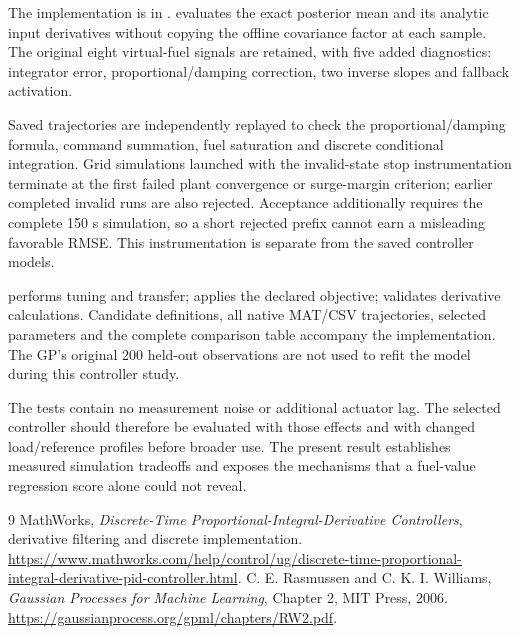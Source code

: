 The implementation is in .  evaluates the exact posterior mean and its analytic input derivatives without copying the offline covariance factor at each sample. The original eight virtual-fuel signals are retained, with five added diagnostics: integrator error, proportional/damping correction, two inverse slopes and fallback activation.

Saved trajectories are independently replayed to check the proportional/damping formula, command summation, fuel saturation and discrete conditional integration. Grid simulations launched with the invalid-state stop instrumentation terminate at the first failed plant convergence or surge-margin criterion; earlier completed invalid runs are also rejected. Acceptance additionally requires the complete 150 s simulation, so a short rejected prefix cannot earn a misleading favorable RMSE. This instrumentation is separate from the saved controller models.

 performs tuning and transfer;  applies the declared objective;  validates derivative calculations. Candidate definitions, all native MAT/CSV trajectories, selected parameters and the complete comparison table accompany the implementation. The GP's original 200 held-out observations are not used to refit the model during this controller study.

The tests contain no measurement noise or additional actuator lag. The selected controller should therefore be evaluated with those effects and with changed load/reference profiles before broader use. The present result establishes measured simulation tradeoffs and exposes the mechanisms that a fuel-value regression score alone could not reveal.

\begin{thebibliography}{9}
 MathWorks, \emph{Discrete-Time Proportional-Integral-Derivative Controllers}, derivative filtering and discrete implementation. \url{https://www.mathworks.com/help/control/ug/discrete-time-proportional-integral-derivative-pid-controller.html}.
 C. E. Rasmussen and C. K. I. Williams, \emph{Gaussian Processes for Machine Learning}, Chapter 2, MIT Press, 2006. \url{https://gaussianprocess.org/gpml/chapters/RW2.pdf}.
\end{thebibliography}

